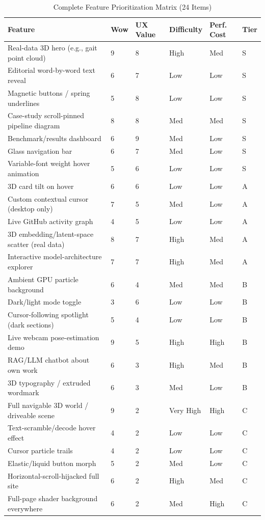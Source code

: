 \documentclass[conference]{IEEEtran}
\begin{document}
\begin{table}[t]
\centering
\caption{Complete Feature Prioritization Matrix (24 Items)}
\label{tab:priomatrix_full}
\begin{tabular}{L{5.0cm}C{1.2cm}C{1.4cm}C{1.6cm}C{1.6cm}C{1.0cm}}
\toprule
\textbf{Feature} & \textbf{Wow} & \textbf{UX Value} & \textbf{Difficulty} & \textbf{Perf. Cost} & \textbf{Tier} \\
\midrule
Real-data 3D hero (e.g., gait point cloud) & 9 & 8 & High & Med & S \\
Editorial word-by-word text reveal & 6 & 7 & Low & Low & S \\
Magnetic buttons / spring underlines & 5 & 8 & Low & Low & S \\
Case-study scroll-pinned pipeline diagram & 8 & 8 & Med & Med & S \\
Benchmark/results dashboard & 6 & 9 & Med & Low & S \\
Glass navigation bar & 6 & 7 & Med & Low & S \\
Variable-font weight hover animation & 5 & 6 & Low & Low & S \\
3D card tilt on hover & 6 & 6 & Low & Low & A \\
Custom contextual cursor (desktop only) & 7 & 5 & Med & Low & A \\
Live GitHub activity graph & 4 & 5 & Low & Low & A \\
3D embedding/latent-space scatter (real data) & 8 & 7 & High & Med & A \\
Interactive model-architecture explorer & 7 & 7 & High & Med & A \\
Ambient GPU particle background & 6 & 4 & Med & Med & B \\
Dark/light mode toggle & 3 & 6 & Low & Low & B \\
Cursor-following spotlight (dark sections) & 5 & 4 & Low & Low & B \\
Live webcam pose-estimation demo & 9 & 5 & High & High & B \\
RAG/LLM chatbot about own work & 6 & 3 & High & Med & B \\
3D typography / extruded wordmark & 6 & 3 & Med & Low & B \\
Full navigable 3D world / driveable scene & 9 & 2 & Very High & High & C \\
Text-scramble/decode hover effect & 4 & 2 & Low & Low & C \\
Cursor particle trails & 4 & 2 & Low & Low & C \\
Elastic/liquid button morph & 5 & 2 & Med & Low & C \\
Horizontal-scroll-hijacked full site & 6 & 2 & High & Med & C \\
Full-page shader background everywhere & 6 & 2 & Med & High & C \\
\bottomrule
\end{tabular}
\end{table}
\end{document}
